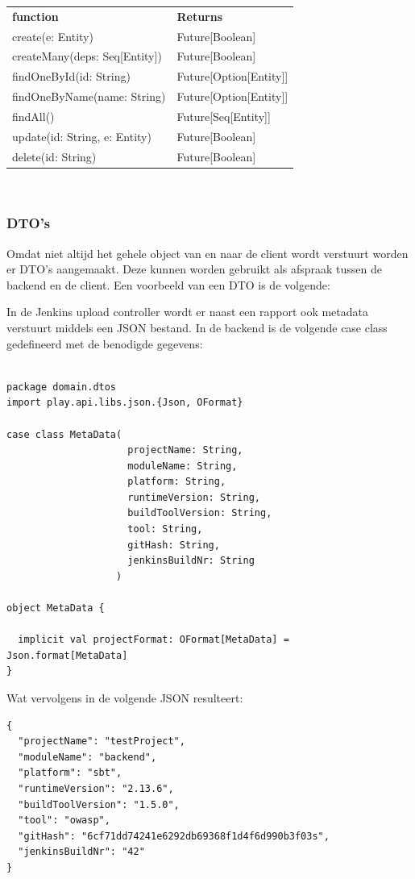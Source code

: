 \begin{tabular}{ll}
    \textbf{function} & \textbf{Returns}\\
    create(e: Entity) & Future[Boolean] \\
    createMany(deps: Seq[Entity])& Future[Boolean]\\
    findOneById(id: String) & Future[Option[Entity]]\\
    findOneByName(name: String) & Future[Option[Entity]]\\
    findAll() & Future[Seq[Entity]] \\
    update(id: String, e: Entity) & Future[Boolean]\\
    delete(id: String) & Future[Boolean] \\
\end{tabular} \\


\subsubsection{DTO's}
Omdat niet altijd het gehele object van en naar de client wordt verstuurt worden er DTO's aangemaakt. Deze kunnen worden gebruikt als afspraak tussen de backend en de client. Een voorbeeld van een DTO is de volgende:

In de Jenkins upload controller wordt er naast een rapport ook metadata verstuurt middels een JSON bestand. In de backend is de volgende case class gedefineerd met de benodigde gegevens:
\begin{lstlisting}[caption={case class MetaData in MetaData.scala},label=lst:metdataScala]

package domain.dtos
import play.api.libs.json.{Json, OFormat}

case class MetaData(
                     projectName: String,
                     moduleName: String,
                     platform: String,
                     runtimeVersion: String,
                     buildToolVersion: String,
                     tool: String,
                     gitHash: String,
                     jenkinsBuildNr: String
                   )

object MetaData {

  implicit val projectFormat: OFormat[MetaData] = Json.format[MetaData]
}

\end{lstlisting}
\newpage
Wat vervolgens in de volgende JSON resulteert:
\begin{lstlisting}[caption={metadata JSon object behorende bij de case class}, label={lst:metadatajson}]
{
  "projectName": "testProject",
  "moduleName": "backend",
  "platform": "sbt",
  "runtimeVersion": "2.13.6",
  "buildToolVersion": "1.5.0",
  "tool": "owasp",
  "gitHash": "6cf71dd74241e6292db69368f1d4f6d990b3f03s",
  "jenkinsBuildNr": "42"
}
\end{lstlisting}
